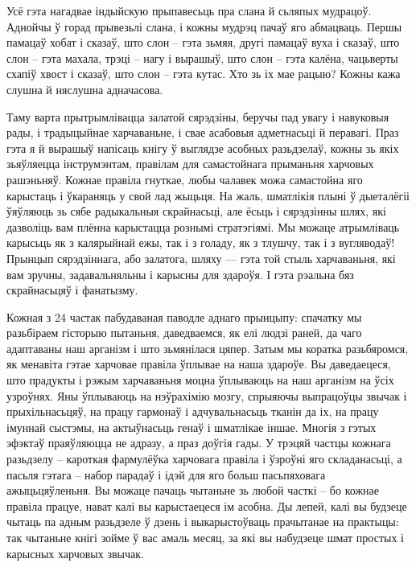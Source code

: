 Усё гэта нагадвае індыйскую прыпавесьць пра слана й сьляпых мудрацоў. Аднойчы ў горад прывезьлі слана, і кожны мудрэц пачаў яго абмацваць. Першы памацаў хобат і сказаў, што слон – гэта зьмяя, другі памацаў вуха і сказаў, што слон – гэта махала, трэці – нагу і вырашыў, што слон – гэта калёна, чацьверты схапіў хвост і сказаў, што слон – гэта кутас. Хто зь іх мае рацыю? Кожны кажа слушна й няслушна адначасова.

Таму варта прытрымлівацца залатой сярэдзіны, беручы пад увагу і навуковыя рады, і традыцыйнае харчаваньне, і свае асабовыя адметнасьці й перавагі. Праз гэта я й вырашыў напісаць кнігу ў выглядзе асобных разьдзелаў, кожны зь якіх зьяўляецца інструмэнтам, правілам для самастойнага прыманьня харчовых рашэньняў. Кожнае правіла гнуткае, любы чалавек можа самастойна яго карыстаць і ўкараняць у свой лад жыцьця. На жаль, шматлікія плыні ў дыеталёгіі ўяўляюць зь сябе радыкальныя скрайнасьці, але ёсьць і сярэдзінны шлях, які дазволіць вам плённа карыстацца рознымі стратэгіямі. Мы можаце атрымліваць карысьць як з калярыйнай ежы, так і з голаду, як з тлушчу, так і з вугляводаў! Прынцып сярэдзіннага, або залатога, шляху — гэта той стыль харчаваньня, які вам зручны, задавальняльны і карысны для здароўя. І гэта рэальна бяз скрайнасьцяў і фанатызму.

Кожная з 24 частак пабудаваная паводле аднаго прынцыпу: спачатку мы разьбіраем гісторыю пытаньня, даведваемся, як елі людзі раней, да чаго адаптаваны наш арганізм і што зьмянілася цяпер. Затым мы коратка разьбяромся, як менавіта гэтае харчовае правіла ўплывае на наша здароўе. Вы даведаецеся, што прадукты і рэжым харчаваньня моцна ўплываюць на наш арганізм на ўсіх узроўнях. Яны ўплываюць на нэўрахімію мозгу, спрыяючы выпрацоўцы звычак і прыхільнасьцяў, на працу гармонаў і адчувальнасьць тканін да іх, на працу імуннай сыстэмы, на актыўнасьць генаў і шматлікае іншае. Многія з гэтых эфэктаў праяўляюцца не адразу, а праз доўгія гады. У трэцяй частцы кожнага разьдзелу – кароткая фармулёўка харчовага правіла і ўзроўні яго складанасьці, а пасьля гэтага – набор парадаў і ідэй для яго больш пасьпяховага ажыцьцяўленьня. Вы можаце пачаць чытаньне зь любой часткі – бо кожнае правіла працуе, нават калі вы карыстаецеся ім асобна. Ды лепей, калі вы будзеце чытаць па адным разьдзеле ў дзень і выкарыстоўваць прачытанае на практыцы: так чытаньне кнігі зойме ў вас амаль месяц, за які вы набудзеце шмат простых і карысных харчовых звычак.

